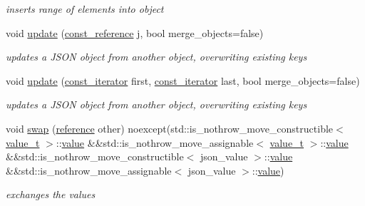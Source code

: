 \begin{DoxyCompactItemize}
\begin{DoxyCompactList}\small\item\em inserts range of elements into object \end{DoxyCompactList}\item 
void \hyperlink{classnlohmann_1_1basic__json_a129a235796b3f95ec93d65c5e4e9fa41}{update} (\hyperlink{classnlohmann_1_1basic__json_ab8a1c33ee7b154fc41ca2545aa9724e6}{const\+\_\+reference} j, bool merge\+\_\+objects=false)
\begin{DoxyCompactList}\small\item\em updates a J\+S\+ON object from another object, overwriting existing keys \end{DoxyCompactList}\item 
void \hyperlink{classnlohmann_1_1basic__json_a4fd9b1d17f9636dec1a33344a09d2651}{update} (\hyperlink{classnlohmann_1_1basic__json_aebd2cfa7e4ded4e97cde9269bfeeea38}{const\+\_\+iterator} first, \hyperlink{classnlohmann_1_1basic__json_aebd2cfa7e4ded4e97cde9269bfeeea38}{const\+\_\+iterator} last, bool merge\+\_\+objects=false)
\begin{DoxyCompactList}\small\item\em updates a J\+S\+ON object from another object, overwriting existing keys \end{DoxyCompactList}\item 
void \hyperlink{classnlohmann_1_1basic__json_a94295a06e0e7b3867fe83afbee4cb202}{swap} (\hyperlink{classnlohmann_1_1basic__json_a220ae98554a76205fb7f8822d36b2d5a}{reference} other) noexcept(std\+::is\+\_\+nothrow\+\_\+move\+\_\+constructible$<$ \hyperlink{namespacenlohmann_1_1detail_a1ed8fc6239da25abcaf681d30ace4985}{value\+\_\+t} $>$\+::\hyperlink{classnlohmann_1_1basic__json_a11641b35219676b225d9bd15c7677659}{value} \&\&std\+::is\+\_\+nothrow\+\_\+move\+\_\+assignable$<$ \hyperlink{namespacenlohmann_1_1detail_a1ed8fc6239da25abcaf681d30ace4985}{value\+\_\+t} $>$\+::\hyperlink{classnlohmann_1_1basic__json_a11641b35219676b225d9bd15c7677659}{value} \&\&std\+::is\+\_\+nothrow\+\_\+move\+\_\+constructible$<$ json\+\_\+value $>$\+::\hyperlink{classnlohmann_1_1basic__json_a11641b35219676b225d9bd15c7677659}{value} \&\&std\+::is\+\_\+nothrow\+\_\+move\+\_\+assignable$<$ json\+\_\+value $>$\+::\hyperlink{classnlohmann_1_1basic__json_a11641b35219676b225d9bd15c7677659}{value})
\begin{DoxyCompactList}\small\item\em exchanges the values \end{DoxyCompactList}\item 

\end{DoxyCompactItemize}
